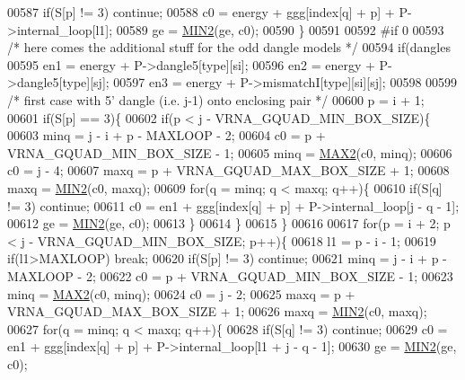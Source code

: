 \begin{DoxyCode}
00587       \textcolor{keywordflow}{if}(S[p] != 3) \textcolor{keywordflow}{continue};
00588       c0  = energy + ggg[index[q] + p] + P->internal\_loop[l1];
00589       ge  = \hyperlink{group__utils_ga2dd4a927a7f937f43a90c144d79107d8}{MIN2}(ge, c0);
00590     \}
00591 
00592 \textcolor{preprocessor}{#if 0}
00593   \textcolor{comment}{/* here comes the additional stuff for the odd dangle models */}
00594   \textcolor{keywordflow}{if}(dangles %
00595     en1 = energy + P->dangle5[type][si];
00596     en2 = energy + P->dangle5[type][sj];
00597     en3 = energy + P->mismatchI[type][si][sj];
00598 
00599     \textcolor{comment}{/* first case with 5' dangle (i.e. j-1) onto enclosing pair */}
00600     p = i + 1;
00601     \textcolor{keywordflow}{if}(S[p] == 3)\{
00602       \textcolor{keywordflow}{if}(p < j - VRNA\_GQUAD\_MIN\_BOX\_SIZE)\{
00603         minq  = j - i + p - MAXLOOP - 2;
00604         c0    = p + VRNA\_GQUAD\_MIN\_BOX\_SIZE - 1;
00605         minq  = \hyperlink{group__utils_gadd91367918fadbc8d585940d6206d6d2}{MAX2}(c0, minq);
00606         c0    = j - 4;
00607         maxq  = p + VRNA\_GQUAD\_MAX\_BOX\_SIZE + 1;
00608         maxq  = \hyperlink{group__utils_ga2dd4a927a7f937f43a90c144d79107d8}{MIN2}(c0, maxq);
00609         \textcolor{keywordflow}{for}(q = minq; q < maxq; q++)\{
00610           \textcolor{keywordflow}{if}(S[q] != 3) \textcolor{keywordflow}{continue};
00611           c0  = en1 + ggg[index[q] + p] + P->internal\_loop[j - q - 1];
00612           ge  = \hyperlink{group__utils_ga2dd4a927a7f937f43a90c144d79107d8}{MIN2}(ge, c0);
00613         \}
00614       \}
00615     \}
00616 
00617     \textcolor{keywordflow}{for}(p = i + 2; p < j - VRNA\_GQUAD\_MIN\_BOX\_SIZE; p++)\{
00618       l1    = p - i - 1;
00619       \textcolor{keywordflow}{if}(l1>MAXLOOP) \textcolor{keywordflow}{break};
00620       \textcolor{keywordflow}{if}(S[p] != 3) \textcolor{keywordflow}{continue};
00621       minq  = j - i + p - MAXLOOP - 2;
00622       c0    = p + VRNA\_GQUAD\_MIN\_BOX\_SIZE - 1;
00623       minq  = \hyperlink{group__utils_gadd91367918fadbc8d585940d6206d6d2}{MAX2}(c0, minq);
00624       c0    = j - 2;
00625       maxq  = p + VRNA\_GQUAD\_MAX\_BOX\_SIZE + 1;
00626       maxq  = \hyperlink{group__utils_ga2dd4a927a7f937f43a90c144d79107d8}{MIN2}(c0, maxq);
00627       \textcolor{keywordflow}{for}(q = minq; q < maxq; q++)\{
00628         \textcolor{keywordflow}{if}(S[q] != 3) \textcolor{keywordflow}{continue};
00629         c0  = en1 + ggg[index[q] + p] + P->internal\_loop[l1 + j - q - 1];
00630         ge   = \hyperlink{group__utils_ga2dd4a927a7f937f43a90c144d79107d8}{MIN2}(ge, c0);

\end{DoxyCode}
